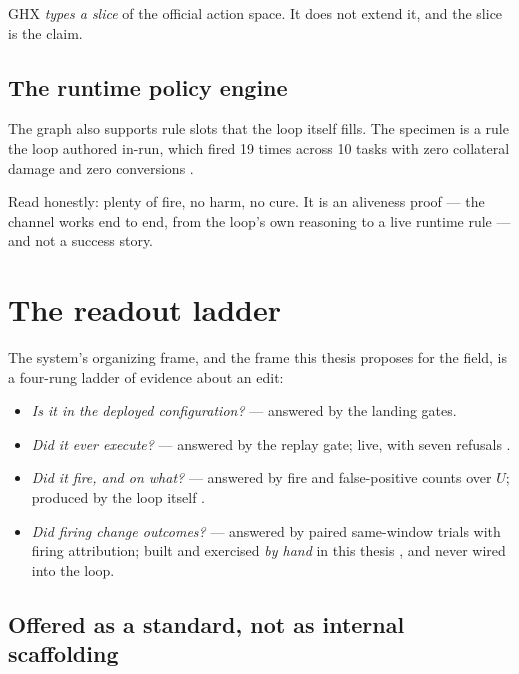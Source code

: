 GHX \emph{types a slice} of the official action space. It does not extend
it, and the slice is the claim.

\subsection*{The runtime policy engine}

The graph also supports rule slots that the loop itself fills. The specimen
is a rule the loop authored in-run, which fired 19 times across 10 tasks
with zero collateral damage and zero conversions .

Read honestly: plenty of fire, no harm, no cure. It is an aliveness proof
--- the channel works end to end, from the loop's own reasoning to a live
runtime rule --- and not a success story.

\section{The readout ladder}
\label{sec:ladder}

The system's organizing frame, and the frame this thesis proposes for the
field, is a four-rung ladder of evidence about an edit:

\begin{itemize}
  \item[\textbf{L0}] \emph{Is it in the deployed configuration?} ---
        answered by the landing gates.
  \item[\textbf{L1}] \emph{Did it ever execute?} --- answered by the replay
        gate; live, with seven refusals .
  \item[\textbf{L2}] \emph{Did it fire, and on what?} --- answered by fire
        and false-positive counts over $U$; produced by the loop itself
        .
  \item[\textbf{L3}] \emph{Did firing change outcomes?} --- answered by
        paired same-window trials with firing attribution; built and
        exercised \emph{by hand} in this thesis , and never
        wired into the loop.
\end{itemize}

\subsection*{Offered as a standard, not as internal scaffolding}

